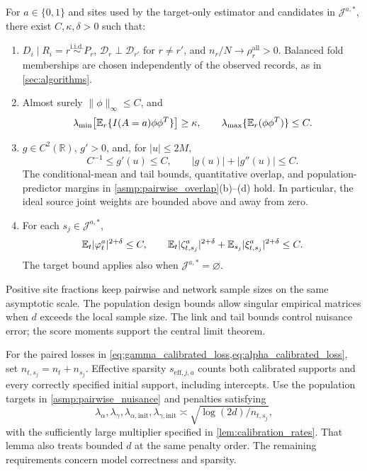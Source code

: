 \documentclass[12pt]{article}
\begin{document}
\begin{assumption}\label{asmp:main_sampling}
For $a\in\{0,1\}$ and sites used by the target-only estimator and candidates in $\mathcal J^{a,*}$, there exist $C,\kappa,\delta>0$ such that:
\begin{enumerate}[label=(\alph*),leftmargin=*]
\item $D_i\mid R_i=r\stackrel{\mathrm{i.i.d.}}{\sim}P_r$, $\mathcal D_r\perp\mathcal D_{r'}$ for $r\ne r'$, and $n_r/N\to\rho_r^{\mathrm{all}}>0$. Balanced fold memberships are chosen independently of the observed records, as in \cref{sec:algorithms}.
\item Almost surely $\|\phi\|_\infty\le C$, and
\[
\lambda_{\min}\!\left[\mathbb{E}_r\{I(A=a)\phi\phi^T\}\right]\ge\kappa,
\qquad \lambda_{\max}\{\mathbb{E}_r(\phi\phi^T)\}\le C.
\]
\item $g\in C^2(\mathbb R)$, $g'>0$, and, for $|u|\le2M$,
\[
C^{-1}\le g'(u)\le C,\qquad |g(u)|+|g''(u)|\le C.
\]
The conditional-mean and tail bounds, quantitative overlap, and population-predictor margins in \cref{asmp:pairwise_overlap}(b)--(d) hold. In particular, the ideal source joint weights are bounded above and away from zero.
\item For each $s_j\in\mathcal J^{a,*}$,
\[
\mathbb{E}_t|\varphi_t^a|^{2+\delta}\le C,\qquad
\mathbb{E}_t|\zeta_{t,s_j}^a|^{2+\delta}+\mathbb{E}_{s_j}|\xi_{t,s_j}^a|^{2+\delta}\le C.
\]
The target bound applies also when $\mathcal J^{a,*}=\varnothing$.
\end{enumerate}
\end{assumption}

Positive site fractions keep pairwise and network sample sizes on the same asymptotic scale. The population design bounds allow singular empirical matrices when $d$ exceeds the local sample size. The link and tail bounds control nuisance error; the score moments support the central limit theorem.

For the paired losses in \cref{eq:gamma_calibrated_loss,eq:alpha_calibrated_loss}, set $n_{t,s_j}=n_t+n_{s_j}$. Effective sparsity $s_{\mathrm{eff},j,a}$ counts both calibrated supports and every correctly specified initial support, including intercepts. Use the population targets in \cref{asmp:pairwise_nuisance} and penalties satisfying
\[
\lambda_\alpha,\lambda_\gamma,\lambda_{\alpha,\mathrm{init}},\lambda_{\gamma,\mathrm{init}}
\asymp\sqrt{\log(2d)/n_{t,s_j}},
\]
with the sufficiently large multiplier specified in \cref{lem:calibration_rates}. That lemma also treats bounded $d$ at the same penalty order. The remaining requirements concern model correctness and sparsity.
\end{document}
